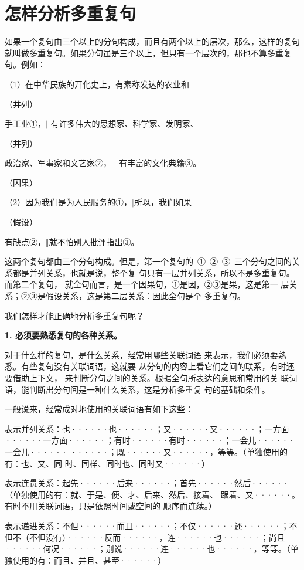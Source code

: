 \section{怎样分析多重复句}

如果一个复句由三个以上的分句构成，而且有两个以上的层次，那么，这样的复句就叫做多重复句。如果分句虽是三个以上，但只有一个层次的，那也不算多重复句。例如：

（1）在中华民族的开化史上，有素称发达的农业和

（并列）

手工业①，$\vert$ 有许多伟大的思想家、科学家、发明家、

\hspace{7em}（并列）

政治家、军事家和文艺家②，
$\vert$ 有丰富的文化典籍③。

\hspace{17em}（因果）

（2）因为我们是为人民服务的①，$\vert$所以，我们如果

\hspace{3em}（假设）

有缺点②，$\Vert$就不怕别人批评指出③。

这两个复句都由三个分句构成。但是，第一个复句的\ 
①\ 
②\ 
③\ 
三个分句之间的关系都是并列关系，也就是说，整个复
句只有一层并列关系，所以不是多重复句。而第二个复句，
就全句而言，是一个因果句，①是因，②③是果，这是第一
层关系；②③是假设关系，这是第二层关系：因此全句是个
多重复句。

我们怎样才能正确地分析多重复句呢？

\textbf{1. 必须要熟悉复句的各种关系。}

对于什么样的复句，是什么关系，经常用哪些关联词语
来表示，我们必须要熟悉。有些复句没有关联词语，这就要
从分句的内容上看它们之间的联系，有时还要借助上下文，
来判断分句之间的关系。根据全句所表达的意思和常用的关
联词语，能判断出分句间是一种什么关系，这是分析多重复
句的基础和条件。

一般说来，经常成对地使用的关联词语有如下这些：

表示并列关系：也······也······；又······又······；一方面
······一方面······；有时······有时······；一会儿······一会儿······
······；既······又······，等等。（单独使用的有：也、又、同
时、同样、同时也、同时又······）

表示连贯关系：起先······后来······；首先······然后······
（单独使用的有：就、于是、便、才、后来、然后、接着、
跟着、又······。有时不用关联词语，只是依照时间或空间的
顺序而连续。）

表示递进关系：不但······而且······；不仅······还······；不但不（不但没有）······反而······，连······也······；尚且······何况······；别说······连······也······，等等。（单独使用的有：而且、并且、甚至······）

